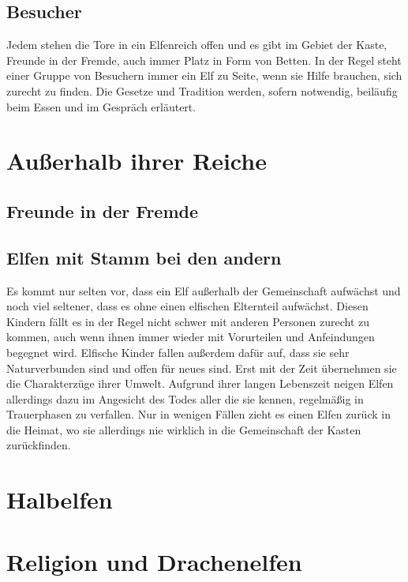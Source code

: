 \documentclass[a4paper,12pt,oneside]{book}
\begin{document}
\chapter{Besucher}
Jedem stehen die Tore in ein Elfenreich offen und es gibt im Gebiet der Kaste, Freunde in der Fremde, auch immer Platz in Form von Betten. In der Regel steht einer Gruppe von Besuchern immer ein Elf zu Seite, wenn sie Hilfe brauchen, sich zurecht zu finden. Die Gesetze und Tradition werden, sofern notwendig, beiläufig beim Essen und im Gespräch erläutert. 

\part{Außerhalb ihrer Reiche}
\chapter{Freunde in der Fremde}

\chapter{Elfen mit Stamm bei den andern}
Es kommt nur selten vor, dass ein Elf außerhalb der Gemeinschaft aufwächst und noch viel seltener, dass es ohne einen elfischen Elternteil aufwächst. Diesen Kindern fällt es in der Regel nicht schwer mit anderen Personen zurecht zu kommen, auch wenn ihnen immer wieder mit Vorurteilen und Anfeindungen begegnet wird. Elfische Kinder fallen außerdem dafür auf, dass sie sehr Naturverbunden sind und offen für neues sind. Erst mit der Zeit übernehmen sie die Charakterzüge ihrer Umwelt. Aufgrund ihrer langen Lebenszeit neigen Elfen allerdings dazu im Angesicht des Todes aller die sie kennen, regelmäßig in Trauerphasen zu verfallen. Nur in wenigen Fällen zieht es einen Elfen zurück in die Heimat, wo sie allerdings nie wirklich in die Gemeinschaft der Kasten zurückfinden.

\part{Halbelfen}

\part{Religion und Drachenelfen}
\end{document}
